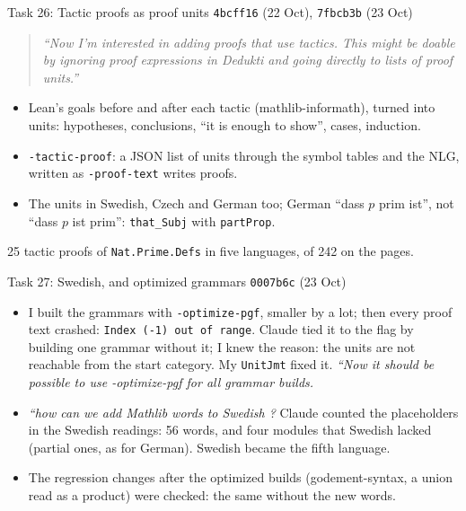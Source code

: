 \documentclass[10pt,aspectratio=169]{beamer}
\newcommand{\bad}[1]{\textcolor{warn}{#1}}
\newcommand{\ok}[1]{\textcolor{good}{#1}}
\newcommand{\commit}[1]{\texttt{\footnotesize #1}}
\newcommand{\prompt}[1]{\begin{quote}\small\itshape ``#1''\end{quote}}
\begin{document}
\begin{frame}{Task 26: Tactic proofs as proof units}
  \commit{4bcff16} (22 Oct), \commit{7fbcb3b} (23 Oct)
  \prompt{Now I'm interested in adding proofs that use tactics. This might be doable by
  ignoring proof expressions in Dedukti and going directly to lists of proof units.}
  \begin{itemize}\small
    \item Lean's goals before and after each tactic (mathlib-informath), turned into units:
          hypotheses, conclusions, ``it is enough to show'', cases, induction.
    \item \texttt{-tactic-proof}: a JSON list of units through the symbol tables and the
          NLG, written as \texttt{-proof-text} writes proofs.
    \item The units in Swedish, Czech and German too; German ``dass $p$ prim \ok{ist}'',
          not \bad{``dass $p$ ist prim''}: \texttt{that\_Subj} with \texttt{partProp}.
  \end{itemize}
  25 tactic proofs of \texttt{Nat.Prime.Defs} in five languages, of 242 on the pages.
\end{frame}

\begin{frame}{Task 27: Swedish, and optimized grammars}
  \commit{0007b6c} (23 Oct)
  \begin{itemize}\small
    \item I built the grammars with \texttt{-optimize-pgf}, smaller by a lot; then every
          proof text crashed: \bad{\texttt{Index (-1) out of range}}. Claude tied it to the
          flag by building one grammar without it; I knew the reason: the units are not
          reachable from the start category. My \texttt{UnitJmt} fixed it.
          \textit{``Now it should be possible to use -optimize-pgf for all grammar builds.}
    \item \textit{``how can we add Mathlib words to Swedish ?} Claude counted the
          placeholders in the Swedish readings: 56 words, and four modules that Swedish
          lacked (partial ones, as for German). Swedish became the fifth language.
    \item The regression changes after the optimized builds (godement-syntax, a union read
          as a product) were checked: the same without the new words.
  \end{itemize}
\end{frame}
\end{document}
